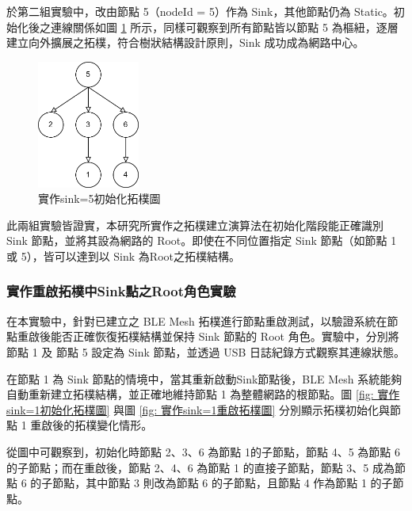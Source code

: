 \begin{ZhChapter}
於第二組實驗中，改由節點 5（nodeId = 5）作為 Sink，其他節點仍為 Static。初始化後之連線關係如圖 \ref{fig: 實作sink=5初始化拓樸圖} 所示，同樣可觀察到所有節點皆以節點 5 為樞紐，逐層建立向外擴展之拓樸，符合樹狀結構設計原則，Sink 成功成為網路中心。

\begin{figure}[H]
    \centering
    \includegraphics[width = 0.3\textwidth]{image/實作sink=5初始化拓樸圖.jpg}
    \caption{實作sink=5初始化拓樸圖}
    \label{fig: 實作sink=5初始化拓樸圖}
\end{figure}

此兩組實驗皆證實，本研究所實作之拓樸建立演算法在初始化階段能正確識別 Sink 節點，並將其設為網路的 Root。即使在不同位置指定 Sink 節點（如節點 1 或 5），皆可以達到以 Sink 為Root之拓樸結構。

\subsubsection{實作重啟拓樸中Sink點之Root角色實驗}
在本實驗中，針對已建立之 BLE Mesh 拓樸進行節點重啟測試，以驗證系統在節點重啟後能否正確恢復拓樸結構並保持 Sink 節點的 Root 角色。實驗中，分別將節點 1 及 節點 5 設定為 Sink 節點，並透過 USB 日誌紀錄方式觀察其連線狀態。

在節點 1 為 Sink 節點的情境中，當其重新啟動Sink節點後，BLE Mesh 系統能夠自動重新建立拓樸結構，並正確地維持節點 1 為整體網路的根節點。圖 \ref{fig: 實作sink=1初始化拓樸圖} 與圖 \ref{fig: 實作sink=1重啟拓樸圖} 分別顯示拓樸初始化與節點 1 重啟後的拓樸變化情形。

從圖中可觀察到，初始化時節點 2、3、6 為節點 1的子節點，節點 4、5 為節點 6 的子節點；而在重啟後，節點 2、4、6 為節點 1 的直接子節點，節點 3、5 成為節點 6 的子節點，其中節點 3 則改為節點 6 的子節點，且節點 4 作為節點 1 的子節點。





\end{ZhChapter}
